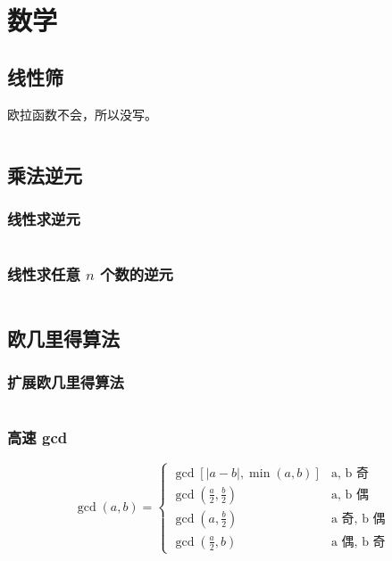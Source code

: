 \section{数学}

\subsection{线性筛}

欧拉函数不会，所以没写。

\inputminted{cpp}{src/math/prime.hpp}

\subsection{乘法逆元}

\subsubsection{线性求逆元}

\inputminted{cpp}{src/math/inv.hpp}

\subsubsection{线性求任意 $n$ 个数的逆元}

\inputminted{cpp}{src/math/inv_any.hpp}

\subsection{欧几里得算法}

\subsubsection{扩展欧几里得算法}

\inputminted[mathescape]{cpp}{src/math/ex_euclid.hpp}

\subsubsection{高速 gcd}

\[
\gcd\left(a, b\right) = \begin{cases}
\gcd\left[|a - b|, \min(a, b)\right] & \text{a, b 奇} \\
\gcd\left(\frac{a}{2}, \frac{b}{2}\right) & \text{a, b 偶} \\
\gcd\left(a, \frac{b}{2}\right) & \text{a 奇, b 偶} \\
\gcd\left(\frac{a}{2}, b\right) & \text{a 偶, b 奇} 
\end{cases}
\]

